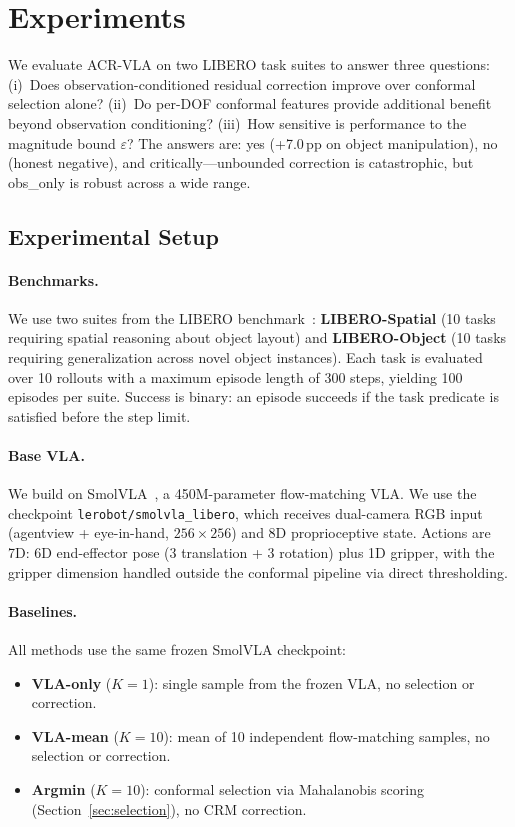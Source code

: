 
\section{Experiments}
\label{sec:experiments}

We evaluate ACR-VLA on two LIBERO task suites to answer three questions:
(i)~Does observation-conditioned residual correction improve over conformal selection alone?
(ii)~Do per-DOF conformal features provide additional benefit beyond observation conditioning?
(iii)~How sensitive is performance to the magnitude bound $\varepsilon$?
The answers are: yes (+7.0\,pp on object manipulation), no (honest negative), and critically---unbounded correction is catastrophic, but obs\_only is robust across a wide range.

\subsection{Experimental Setup}
\label{sec:exp_setup}

\paragraph{Benchmarks.}
We use two suites from the LIBERO benchmark~\cite{liu2023libero}:
\textbf{LIBERO-Spatial} (10 tasks requiring spatial reasoning about object layout) and \textbf{LIBERO-Object} (10 tasks requiring generalization across novel object instances).
Each task is evaluated over 10 rollouts with a maximum episode length of 300 steps, yielding 100 episodes per suite. Success is binary: an episode succeeds if the task predicate is satisfied before the step limit.

\paragraph{Base VLA.}
We build on SmolVLA~\cite{shukor2025smolvla}, a 450M-parameter flow-matching VLA.
We use the checkpoint \texttt{lerobot/smolvla\_libero}, which receives dual-camera RGB input (agentview + eye-in-hand, $256{\times}256$) and 8D proprioceptive state.
Actions are 7D: 6D end-effector pose (3 translation + 3 rotation) plus 1D gripper, with the gripper dimension handled outside the conformal pipeline via direct thresholding.

\paragraph{Baselines.}
All methods use the same frozen SmolVLA checkpoint:
\begin{itemize}[nosep]
  \item \textbf{VLA-only} ($K{=}1$): single sample from the frozen VLA, no selection or correction.
  \item \textbf{VLA-mean} ($K{=}10$): mean of 10 independent flow-matching samples, no selection or correction.
  \item \textbf{Argmin} ($K{=}10$): conformal selection via Mahalanobis scoring (Section~\ref{sec:selection}), no CRM correction.
\end{itemize}

